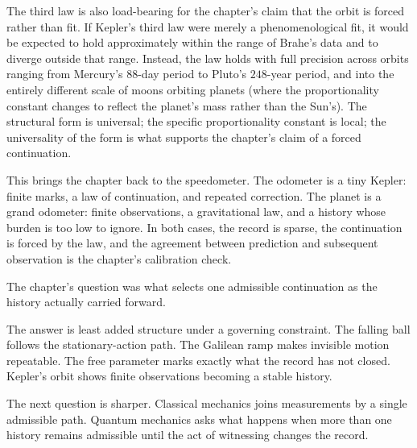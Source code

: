 The third law is also load-bearing for the chapter's claim that the
orbit is forced rather than fit. If Kepler's third law were merely a
phenomenological fit, it would be expected to hold approximately within
the range of Brahe's data and to diverge outside that range. Instead, the
law holds with full precision across orbits ranging from Mercury's
$88$-day period to Pluto's $248$-year period, and into the entirely
different scale of moons orbiting planets (where the proportionality
constant changes to reflect the planet's mass rather than the Sun's).
The structural form is universal; the specific proportionality constant
is local; the universality of the form is what supports the chapter's
claim of a forced continuation.

This brings the chapter back to the speedometer. The odometer is a tiny
Kepler: finite marks, a law of continuation, and repeated correction. The
planet is a grand odometer: finite observations, a gravitational law, and
a history whose burden is too low to ignore. In both cases, the record is
sparse, the continuation is forced by the law, and the agreement between
prediction and subsequent observation is the chapter's calibration check.

\begin{bridge}

The chapter's question was what selects one admissible continuation as the
history actually carried forward.

The answer is least added structure under a governing constraint. The falling
ball follows the stationary-action path. The Galilean ramp makes invisible
motion repeatable. The free parameter marks exactly what the record has not
closed. Kepler's orbit shows finite observations becoming a stable history.

The next question is sharper. Classical mechanics joins measurements by a
single admissible path. Quantum mechanics asks what happens when more than one
history remains admissible until the act of witnessing changes the record.

\end{bridge}

